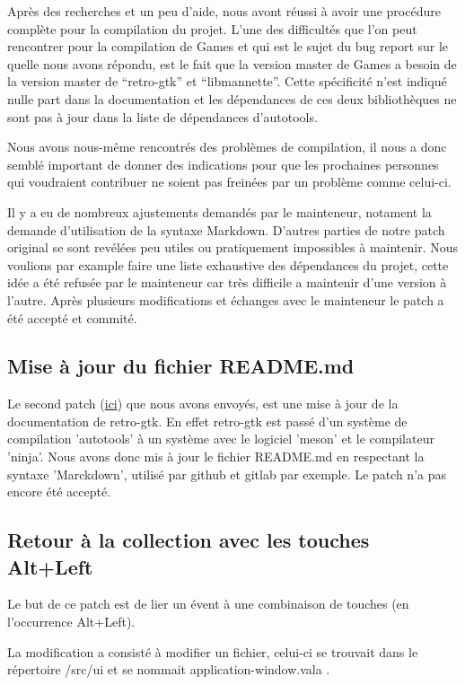 \documentclass[12pt]{report}
\begin{document}
Après des recherches et un peu d'aide, nous avont réussi à avoir une procédure
complète pour la compilation du projet. L'une des difficultés que l'on peut
rencontrer pour la compilation de Games et qui est le sujet du bug report sur le
quelle nous avons répondu, est le fait que la version master de Games a besoin de
la version master de ``retro-gtk'' et ``libmannette''. Cette spécificité n'est
indiqué nulle part dans la documentation et les dépendances de ces deux
bibliothèques ne sont pas à jour dans la liste de dépendances d'autotools.

Nous avons nous-même rencontrés des problèmes de compilation, il nous a donc
semblé important de donner des indications pour que les prochaines personnes qui
voudraient contribuer ne soient pas freinées par un problème comme celui-ci.

Il y a eu de nombreux ajustements demandés par le mainteneur, notament la demande
d'utilisation de la syntaxe Markdown. D'autres parties de notre patch original se sont
revélées peu utiles ou pratiquement impossibles à maintenir. Nous voulions par
example faire une liste exhaustive des dépendances du projet, cette idée a été
refusée par le mainteneur car très difficile a maintenir d'une version à l'autre.
Après plusieurs modifications et échanges avec le mainteneur le patch a été
accepté et commité.

\subsection{Mise à jour du fichier README.md}
Le second patch (\href{http://bugzilla.gnome.org/show_bug.cgi?id=790454}{ici}) 
que nous avons envoyés, est une mise à jour de la documentation de retro-gtk.
En effet retro-gtk est passé d'un système de compilation 'autotools' à un
système avec le logiciel 'meson' et le compilateur 'ninja'.
Nous avons donc mis à jour le fichier README.md en respectant la syntaxe
'Marckdown', utilisé par github et gitlab par exemple.
Le patch n'a pas encore été accepté.

\subsection{Retour à la collection avec les touches Alt+Left}
Le but de ce patch est de lier un évent à une combinaison de touches
(en l’occurrence Alt+Left).

La modification a consisté à modifier un fichier, celui-ci se trouvait
dans le répertoire /src/ui et se nommait application-window.vala .
\end{document}
